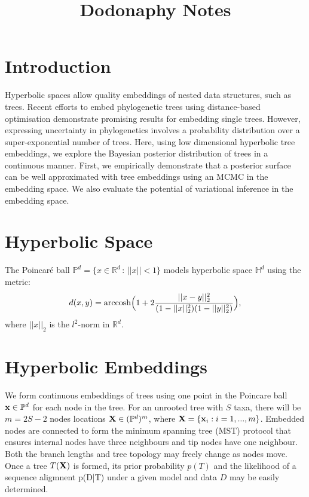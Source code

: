 \documentclass[11pt]{article}
\title{Dodonaphy Notes}
\begin{document}
\maketitle
\section{Introduction}
Hyperbolic spaces allow quality embeddings of nested data structures, such as trees.
Recent efforts to embed phylogenetic trees using distance-based optimisation demonstrate promising results for embedding single trees.
However, expressing uncertainty in phylogenetics involves a probability distribution over a super-exponential number of trees.
Here, using low dimensional hyperbolic tree embeddings, we explore the Bayesian posterior distribution of trees in a continuous manner.
First, we empirically demonstrate that a posterior surface can be well approximated with tree embeddings using an MCMC in the embedding space.
We also evaluate the potential of variational inference in the embedding space.

\section{Hyperbolic Space}
The Poincaré ball $\mathbb{P}^{d} = \{x\in \mathbb{R}^{d} \,:\, ||x||<1\}$ models hyperbolic space $\mathbb{H}^{d}$ using the metric:
\begin{equation*}\label{eq:poin_dist}
d(x,y) = \textnormal{arccosh}\Big(1 + 2 \frac{||x-y||_{2}^{2}}{ (1-||x||_{2}^{2}) (1-||y||_{2}^{2})}\Big),
\end{equation*}
where $||x||_{2}$ is the $l^{2}$-norm in $\mathbb{R}^{d}$.

\section{Hyperbolic Embeddings}
We form continuous embeddings of trees using one point in the Poincare ball $\bold{x} \in \mathbb{P}^{d}$ for each node in the tree.
For an unrooted tree with $S$ taxa, there will be $m=2S - 2$ nodes locations $\bold{X} \in(\mathbb{P}^{d})^{m}$, where $\bold{X} = \{\bold{x}_{i}: i=1, ..., m\}$.
Embedded nodes are connected to form the minimum spanning tree (MST) protocol that ensures internal nodes have three neighbours and tip nodes have one neighbour.
Both the branch lengths and tree topology may freely change as nodes move.
Once a tree $T(\bold{X})$ is formed, its prior probability $p(T)$ and the likelihood of a sequence aligmnent p(D\big|T) under a given model and data $D$ may be easily determined.
\end{document}
